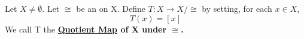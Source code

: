 \label{df:quotient_map}
\newcommand{\QuotientMap}[0]{
        \bf \hyperref[df:quotient_map]{Quotient Map} \rm
    }
    
 \newcommand{\QuotientMapInstance}[3]{
     #1 : #2\to #2/#3
}
\begin{df}

    Let $X \neq \emptyset$.
    Let $\cong$ be an 
	\EquivalenceRelation 
	on X.
    Define $T:X \to X/\cong$ by setting, for each $x \in X$, 
    \begin{equation}
        T(x)=[x]
    \end{equation}    
    We call T the \QuotientMap of X under $\cong$. 
\end{df} 